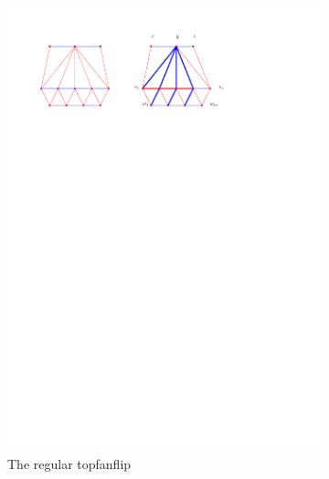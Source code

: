 \begin{figure}
    \centering
    \begin{subfigure}[b]{0.8 \textwidth}
        \includegraphics[width = \textwidth]{topFanFlips/img/regular}
        \caption{The regular topfanflip}
        \label{fig:fanflip:regular}
    \end{subfigure}
    ~
    \centering
    \begin{subfigure}[b]{0.45 \textwidth}

\end{subfigure}
\end{figure}

